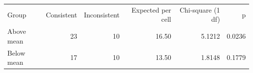 \begin{tabular}{lrrrrr}
Group & Consistent & Inconsistent & Expected per cell & Chi-square (1 df) & p \\
Above mean &  23 &  10 &  16.50 &  5.1212 &  0.0236 \\
Below mean &  17 &  10 &  13.50 &  1.8148 &  0.1779 \\
\end{tabular}
